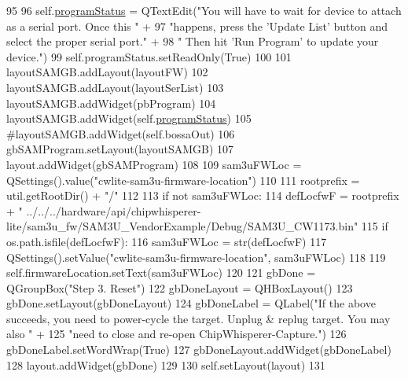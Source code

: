 \begin{DoxyCode}
95 
96         self.\hyperlink{classsoftware_1_1chipwhisperer_1_1capture_1_1scopes_1_1cwhardware_1_1ChipWhispererSAM3Update_1_1SAM3LoaderConfig_aef902ef2dcfcc0c73adc1487ef0eef29}{programStatus} = QTextEdit(\textcolor{stringliteral}{"You will have to wait for device to attach as a serial
       port. Once this "} +
97                                        \textcolor{stringliteral}{"happens, press the 'Update List' button and select the proper
       serial port."} +
98                                        \textcolor{stringliteral}{" Then hit 'Run Program' to update your device."})
99         self.programStatus.setReadOnly(\textcolor{keyword}{True})
100 
101         layoutSAMGB.addLayout(layoutFW)
102         layoutSAMGB.addLayout(layoutSerList)
103         layoutSAMGB.addWidget(pbProgram)
104         layoutSAMGB.addWidget(self.\hyperlink{classsoftware_1_1chipwhisperer_1_1capture_1_1scopes_1_1cwhardware_1_1ChipWhispererSAM3Update_1_1SAM3LoaderConfig_aef902ef2dcfcc0c73adc1487ef0eef29}{programStatus})
105         \textcolor{comment}{#layoutSAMGB.addWidget(self.bossaOut)}
106         gbSAMProgram.setLayout(layoutSAMGB)
107         layout.addWidget(gbSAMProgram)
108 
109         sam3uFWLoc = QSettings().value(\textcolor{stringliteral}{"cwlite-sam3u-firmware-location"})
110 
111         rootprefix = util.getRootDir() + \textcolor{stringliteral}{"/"}
112 
113         \textcolor{keywordflow}{if} \textcolor{keywordflow}{not} sam3uFWLoc:
114             defLocfwF = rootprefix + \textcolor{stringliteral}{"
      ../../../hardware/api/chipwhisperer-lite/sam3u\_fw/SAM3U\_VendorExample/Debug/SAM3U\_CW1173.bin"}
115             \textcolor{keywordflow}{if} os.path.isfile(defLocfwF):
116                 sam3uFWLoc = str(defLocfwF)
117                 QSettings().setValue(\textcolor{stringliteral}{"cwlite-sam3u-firmware-location"}, sam3uFWLoc)
118 
119         self.firmwareLocation.setText(sam3uFWLoc)
120 
121         gbDone = QGroupBox(\textcolor{stringliteral}{"Step 3. Reset"})
122         gbDoneLayout = QHBoxLayout()
123         gbDone.setLayout(gbDoneLayout)
124         gbDoneLabel = QLabel(\textcolor{stringliteral}{"If the above succeeds, you need to power-cycle the target. Unplug & replug
       target. You may also "} +
125                              \textcolor{stringliteral}{"need to close and re-open ChipWhisperer-Capture."})
126         gbDoneLabel.setWordWrap(\textcolor{keyword}{True})
127         gbDoneLayout.addWidget(gbDoneLabel)
128         layout.addWidget(gbDone)
129 
130         self.setLayout(layout)
131 
\end{DoxyCode}


